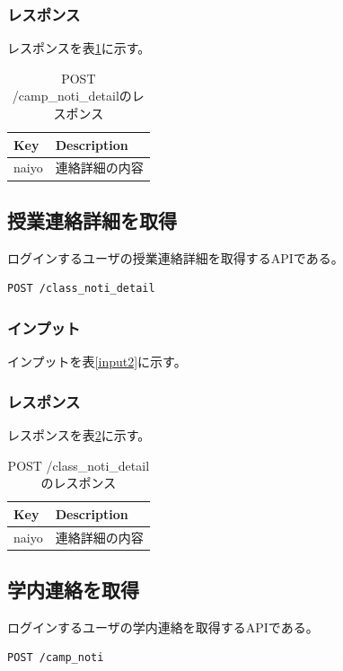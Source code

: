 \documentclass[a4j,12pt,onecolumn,oneside,titlepage,openany,final]{jreport}
\begin{document}
\subsubsection{レスポンス}
レスポンスを表\ref{camp_del}に示す。
\begin{table}[htbp]
\caption{POST /camp\_noti\_detailのレスポンス}
\centering
\begin{tabular}{|l|l|}
\hline
Key                    & Description                    \\ \hline
naiyo                   & 連絡詳細の内容 \\ \hline
\end{tabular}
\label{camp_del}
\end{table}
\subsection{授業連絡詳細を取得}
ログインするユーザの授業連絡詳細を取得するAPIである。
\begin{lstlisting}[language=http, firstnumber=1]
POST /class_noti_detail
\end{lstlisting}

\subsubsection{インプット}
インプットを表\ref{input2}に示す。
\subsubsection{レスポンス}
レスポンスを表\ref{class_del}に示す。

\begin{table}[htbp]
\caption{POST /class\_noti\_detailのレスポンス}
\centering
\begin{tabular}{|l|l|}
\hline
Key                    & Description                    \\ \hline
naiyo                   & 連絡詳細の内容 \\ \hline
\end{tabular}
\label{class_del}
\end{table}
\subsection{学内連絡を取得}
ログインするユーザの学内連絡を取得するAPIである。
\begin{lstlisting}[language=http, firstnumber=1]
POST /camp_noti
\end{lstlisting}
\end{document}
